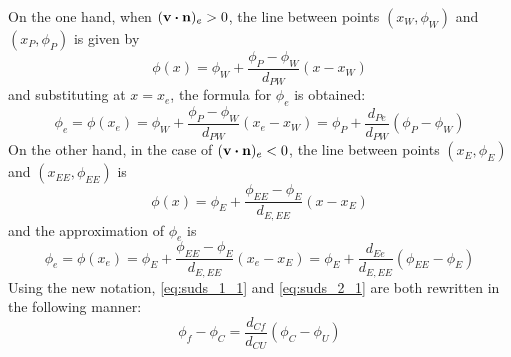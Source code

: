 \noindent
On the one hand, when $(\vb{v} \vdot \vb{n})_e > 0$, the line between points $(x_W, \phi_W)$ and $(x_P, \phi_P)$ is given by
\begin{equation}
	\phi(x) = \phi_W + \frac{\phi_P - \phi_W}{d_{PW}} (x - x_W)
\end{equation}
and substituting at $x = x_e$, the formula for $\phi_e$ is obtained:
\begin{equation} \label{eq:suds_1_1}
	\phi_e = 
	\phi(x_e) = 
	\phi_W + \frac{\phi_P - \phi_W}{d_{PW}} (x_e - x_W) = 
	\phi_P + \frac{d_{Pe}}{d_{PW}} (\phi_P - \phi_W) 
\end{equation}
On the other hand, in the case of $(\vb{v} \vdot \vb{n})_e < 0$, the line between points $(x_E, \phi_E)$ and $(x_{EE}, \phi_{EE})$ is
\begin{equation}
	\phi(x) = \phi_E + \frac{\phi_{EE} - \phi_E}{d_{E,EE}} (x - x_E)
\end{equation}
and the approximation of $\phi_e$ is
\begin{equation} \label{eq:suds_2_1}
	\phi_e = 
	\phi(x_e) = 
	\phi_E + \frac{\phi_{EE} - \phi_E}{d_{E,EE}} (x_e - x_E) =
	\phi_E + \frac{d_{Ee}}{d_{E,EE}} (\phi_{EE} - \phi_E)	
\end{equation}
Using the new notation, \eqref{eq:suds_1_1} and \eqref{eq:suds_2_1} are both rewritten in the following manner:
\begin{equation}
	\phi_f - \phi_C = \frac{d_{Cf}}{d_{CU}} (\phi_C - \phi_U)
\end{equation}

